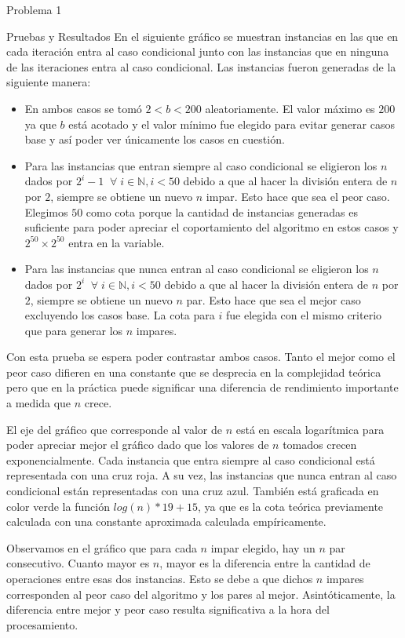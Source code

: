 \begin{section}{Problema 1}
\begin{subsection}{Pruebas y Resultados}
En el siguiente gráfico se muestran instancias en las que en cada iteración entra al caso condicional junto con las instancias que en ninguna de las iteraciones entra al caso condicional. Las instancias fueron generadas de la siguiente manera:
\begin{itemize}
	\item En ambos casos se tomó $2 < b < 200$ aleatoriamente. El valor máximo es $200$ ya que $b$ está acotado y el valor mínimo fue elegido para evitar generar casos base y así poder ver únicamente los casos en cuestión.
	\item Para las instancias que entran siempre al caso condicional se eligieron los $n$ dados por $2^i-1\;\;\forall\; i\in\mathbb{N}, i < 50$ debido a que al hacer la división entera de $n$ por $2$, siempre se obtiene un nuevo $n$ impar. Esto hace que sea el peor caso. Elegimos $50$ como cota porque la cantidad de instancias generadas es suficiente para poder apreciar el coportamiento del algoritmo en estos casos y $2^{50} \times 2^{50}$ entra en la variable.
	\item Para las instancias que nunca entran al caso condicional se eligieron los $n$ dados por $2^i\;\;\forall\; i\in\mathbb{N}, i < 50$ debido a que al hacer la división entera de $n$ por $2$, siempre se obtiene un nuevo $n$ par. Esto hace que sea el mejor caso excluyendo los casos base. La cota para $i$ fue elegida con el mismo criterio que para generar los $n$ impares.
\end{itemize}

	Con esta prueba se espera poder contrastar ambos casos. Tanto el mejor como el peor caso difieren en una constante que se desprecia en la complejidad teórica pero que en la práctica puede significar una diferencia de rendimiento importante a medida que $n$ crece.

El eje del gráfico que corresponde al valor de $n$ está en escala logarítmica para poder apreciar mejor el gráfico dado que los valores de $n$ tomados crecen exponencialmente. Cada instancia que entra siempre al caso condicional está representada con una cruz roja. A su vez, las instancias que nunca entran al caso condicional están representadas con una cruz azul. También está graficada en color verde la función $log(n)*19+15$, ya que es la cota teórica previamente calculada con una constante aproximada calculada empíricamente. \\
		\VSP

Observamos en el gráfico que para cada $n$ impar elegido, hay un $n$ par consecutivo. Cuanto mayor es $n$, mayor es la diferencia entre la cantidad de operaciones entre esas dos instancias. Esto se debe a que dichos $n$ impares corresponden al peor caso del algoritmo y los pares al mejor. Asintóticamente, la diferencia entre mejor y peor caso resulta significativa a la hora del procesamiento.


\end{subsection}
\end{section}
